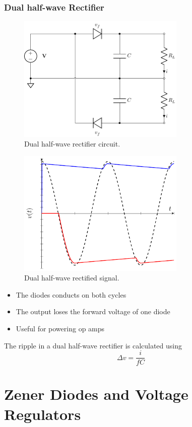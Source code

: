 \documentclass{article}
\begin{document}
\subsubsection{Dual half-wave Rectifier}
\begin{figure}[H]
    \centering
    \includegraphics[width = 8cm, keepaspectratio = true]{figures/dual_half_wave_rectifier.pdf}
    \caption{Dual half-wave rectifier circuit.}
\end{figure}
\begin{figure}[H]
    \centering
    \includegraphics[width = 8cm, keepaspectratio = true]{figures/dual_half_wave_rectifier_plot.pdf}
    \caption{Dual half-wave rectified signal.}
\end{figure}
\begin{itemize}
    \item The diodes conducts on both cycles
    \item The output loses the forward voltage of one diode
    \item Useful for powering op amps
\end{itemize}
The ripple in a dual half-wave rectifier is calculated using
\begin{equation*}
    \Delta v = \frac{i}{fC}
\end{equation*}
\newpage
\section{Zener Diodes and Voltage Regulators}
\end{document}

